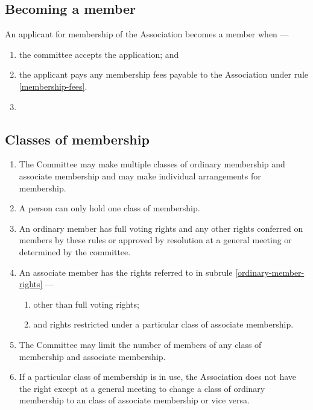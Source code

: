 \documentclass[../constitution.tex]{subfiles}
\begin{document}
\subsection{Becoming a member} \label{becoming-a-member}


An applicant for membership of the Association becomes a member when ---

\begin{enumerate}
\def\labelenumi{\alph{enumi})}
\setcounter{enumi}{0}
\item the committee accepts the application; and
\item the applicant pays any membership fees payable to the Association under rule \ref{membership-fees}.
\item 
\end{enumerate}



\subsection{Classes of membership} \label{classes-of-membership}

\begin{enumerate}
\item The Committee may make multiple classes of ordinary membership and associate membership and may make individual arrangements for membership. 
\item A person can only hold one class of membership. 
\item An ordinary member has full voting rights and any other rights conferred on members by these rules or approved by resolution at a general meeting or determined by the committee. \label{ordinary-member-rights}
\item An associate member has the rights referred to in subrule \ref{ordinary-member-rights} --- \label{associate-member-rights}
  \begin{enumerate}
  \item other than full voting rights;
  \item and rights restricted under a particular class of associate membership.
  \end{enumerate}
\item The Committee may limit the number of members of any class of membership and associate membership.
\item \label{swap-ordinary-associate-membership} If a particular class of membership is in use, the Association does not have the right except at a general meeting to change a class of ordinary membership to an class of associate membership or vice versa.
\end{enumerate}
\end{document}
